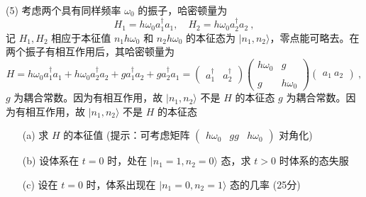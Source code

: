 (5) 考虑两个具有同样频率 $\omega_0$ 的振子，哈密顿量为
$$ H_1 = h \omega_0 a_1^\dagger a_1, \quad H_2 = h \omega_0 a_2^\dagger a_2~, $$
记 $H_1, H_2$ 相应于本征值 $n_1 h \omega_0$ 和 $n_2 h \omega_0$ 的本征态为 $|n_1, n_2 \rangle$，零点能可略去。在两个振子有相互作用后，其哈密顿量为
$$  H = h \omega_0 a_1^\dagger a_1 + h \omega_0 a_2^\dagger a_2 + g a_1^\dagger a_2 + g a_2^\dagger a_1 = \begin{pmatrix} a_1^\dagger & a_2^\dagger \end{pmatrix} \begin{pmatrix} h \omega_0 & g \\\\ g & h \omega_0 \end{pmatrix} \begin{pmatrix} a_1 \ a_2 \end{pmatrix}~, $$ 
$g$ 为耦合常数。因为有相互作用，故 $|n_1, n_2 \rangle$ 不是 $H$ 的本征态
$g$ 为耦合常数。因为有相互作用，故 $|n_1, n_2 \rangle$ 不是 $H$ 的本征态
\begin{itemize}
    \item [(a)] 求 $H$ 的本征值 (提示：可考虑矩阵 $\begin{pmatrix} h \omega_0 & g  g & h \omega_0 \end{pmatrix}$ 对角化) 
    \item [(b)] 设体系在 $t=0$ 时，处在 $|n_1=1, n_2=0 \rangle$ 态，求 $t>0$ 时体系的态失服 
    \item [(c)] 设在 $t=0$ 时，体系出现在 $|n_1=0, n_2=1 \rangle$ 态的几率 (25分)

\end{itemize}